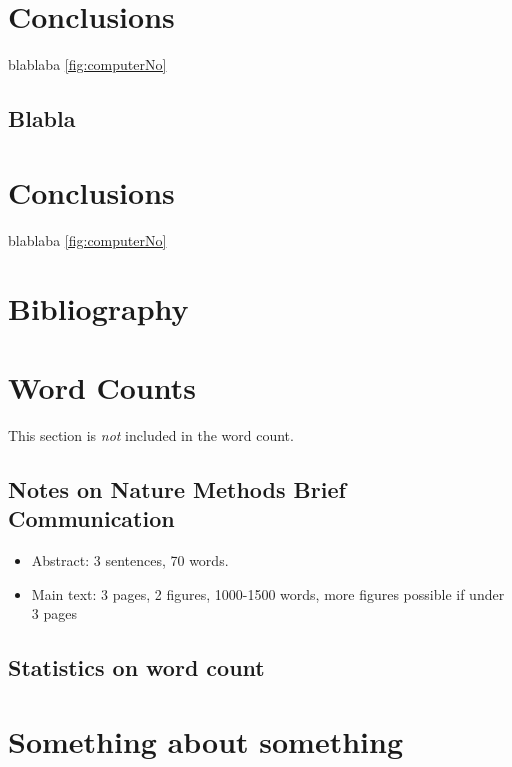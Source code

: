 \documentclass[times, twoside, watermark]{zHenriquesLab-StyleBioRxiv}
\begin{document}
\section*{Conclusions}

blablaba \ref{fig:computerNo} 
\blindtext

\subsection*{Blabla} 
\blindtext

\section*{Conclusions}

blablaba \ref{fig:computerNo}
\blindtext

\begin{acknowledgements}
\blindtext
\end{acknowledgements}

\section*{Bibliography}


\onecolumn
\newpage

\section*{Word Counts}
This section is \textit{not} included in the word count. 
\subsection*{Notes on Nature Methods Brief Communication}
\begin{itemize}
\item Abstract: 3 sentences, 70 words.
\item Main text: 3 pages, 2 figures, 1000-1500 words, more figures possible if under 3 pages
\end{itemize}

\subsection*{Statistics on word count}
\detailtexcount
\newpage

\captionsetup*{format=largeformat}
\section{Something about something} \label{note:Note1} 
\Blindtext

\end{document}
